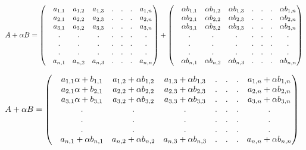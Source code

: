\documentclass[45pt]{article}
\begin{document}
\begin{enumerate}
    $
        A+ \alpha B =\begin{pmatrix}
            & a_{1,1} & a_{1,2} & a_{1,3} &.&.&.& a_{1,n}  \\
            & a_{2,1} & a_{2,2} & a_{2,3} &.&.&.& a_{2,n}  \\
            & a_{3,1} & a_{3,2} & a_{3,3} &.&.&.& a_{3,n}  \\
            & . & . & . &.&.&.&.\\
            & . & . & . &.&.&.&.\\
            & . & . & . &.&.&.&.\\
            & a_{n,1} & a_{n,2} & a_{n,3} &.&.&.& a_{n,n}  \\
            \end{pmatrix} + \begin{pmatrix}
        & \alpha b_{1,1} & \alpha b_{1,2} & \alpha b_{1,3} &.&.&.& \alpha b_{1,n}  \\
        & \alpha b_{2,1} & \alpha b_{2,2} & \alpha b_{2,3} &.&.&.& \alpha b_{2,n}  \\
        & \alpha b_{3,1} & \alpha b_{3,2} & \alpha b_{3,3} &.&.&.& \alpha b_{3,n}  \\
        & . & . & . &.&.&.&.\\
        & . & . & . &.&.&.&.\\
        & . & . & . &.&.&.&.\\
        & \alpha b_{n,1} & \alpha b_{n,2} & \alpha b_{n,3} &.&.&.& \alpha b_{n,n}  \\
        \end{pmatrix}\\\\
    $

$
    A+ \alpha B =
    \begin{pmatrix}
        
        & a_{1,1} \alpha + b_{1,1} & a_{1,2} + \alpha b_{1,2} & a_{1,3} + \alpha b_{1,3}  &.&.&.& a_{1,n} +\alpha b_{1,n}  \\
        & a_{2,1} \alpha + b_{2,1} & a_{2,2} + \alpha b_{2,2} & a_{2,3} + \alpha b_{2,3}  &.&.&.& a_{2,n} +\alpha b_{2,n}  \\
        & a_{3,1} \alpha + b_{3,1} & a_{3,2} + \alpha b_{3,2} & a_{3,3} + \alpha b_{3,3}  &.&.&.& a_{3,n} +\alpha b_{3,n}  \\
        & . & . & . &.&.&.&.\\
        & . & . & . &.&.&.&.\\
        & . & . & . &.&.&.&.\\
        & a_{n,1}+\alpha b_{n,1} & a_{n,2} + \alpha b_{n,2} & a_{n,3}+\alpha b_{n,3} &.&.&.& a_{n,n}+\alpha b_{n,n}  \\
    \end{pmatrix}\\\\$


\end{enumerate}
\end{document}
